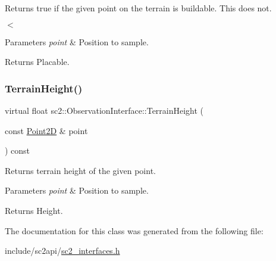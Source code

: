 Returns \textquotesingle{}true\textquotesingle{} if the given point on the terrain is buildable. This does not. 

$<$ 
\begin{DoxyParams}{Parameters}
{\em point} & Position to sample. \\
\hline
\end{DoxyParams}
\begin{DoxyReturn}{Returns}
Placable. 
\end{DoxyReturn}
\mbox{\label{classsc2_1_1_observation_interface_a8e6d0c2bce48f675b3d4b99f925dfafb}} 
\subsubsection{\texorpdfstring{Terrain\+Height()}{TerrainHeight()}}
{\footnotesize\ttfamily virtual float sc2\+::\+Observation\+Interface\+::\+Terrain\+Height (\begin{DoxyParamCaption}\item[{const \hyperlink{structsc2_1_1_point2_d}{Point2D} \&}]{point }\end{DoxyParamCaption}) const\hspace{0.3cm}{\ttfamily [pure virtual]}}

Returns terrain height of the given point. 
\begin{DoxyParams}{Parameters}
{\em point} & Position to sample. \\
\hline
\end{DoxyParams}
\begin{DoxyReturn}{Returns}
Height. 
\end{DoxyReturn}


The documentation for this class was generated from the following file\+:\begin{DoxyCompactItemize}
\item 
include/sc2api/\hyperlink{sc2__interfaces_8h}{sc2\+\_\+interfaces.\+h}\end{DoxyCompactItemize}
